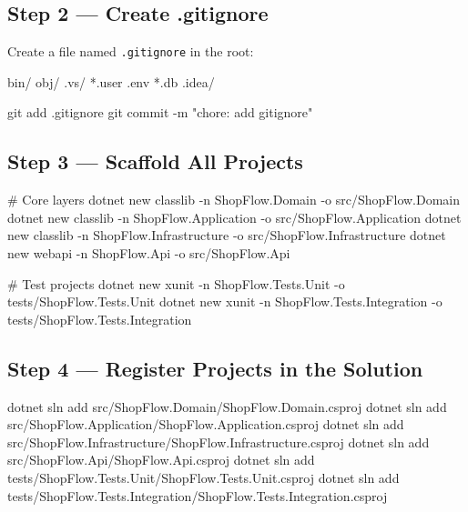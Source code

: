 \documentclass[11pt,a4paper]{article}
\begin{document}
\subsection{Step 2 --- Create .gitignore}

Create a file named \texttt{.gitignore} in the root:

\begin{codeframe}
\begin{codeblock}
bin/
obj/
.vs/
*.user
.env
*.db
.idea/
\end{codeblock}
\end{codeframe}

\begin{codeframe}
\begin{codeblock}
git add .gitignore
git commit -m "chore: add gitignore"
\end{codeblock}
\end{codeframe}

\subsection{Step 3 --- Scaffold All Projects}

\begin{codeframe}
\begin{codeblock}
# Core layers
dotnet new classlib -n ShopFlow.Domain         -o src/ShopFlow.Domain
dotnet new classlib -n ShopFlow.Application    -o src/ShopFlow.Application
dotnet new classlib -n ShopFlow.Infrastructure -o src/ShopFlow.Infrastructure
dotnet new webapi   -n ShopFlow.Api            -o src/ShopFlow.Api

# Test projects
dotnet new xunit -n ShopFlow.Tests.Unit        -o tests/ShopFlow.Tests.Unit
dotnet new xunit -n ShopFlow.Tests.Integration -o tests/ShopFlow.Tests.Integration
\end{codeblock}
\end{codeframe}

\subsection{Step 4 --- Register Projects in the Solution}

\begin{codeframe}
\begin{codeblock}
dotnet sln add src/ShopFlow.Domain/ShopFlow.Domain.csproj
dotnet sln add src/ShopFlow.Application/ShopFlow.Application.csproj
dotnet sln add src/ShopFlow.Infrastructure/ShopFlow.Infrastructure.csproj
dotnet sln add src/ShopFlow.Api/ShopFlow.Api.csproj
dotnet sln add tests/ShopFlow.Tests.Unit/ShopFlow.Tests.Unit.csproj
dotnet sln add tests/ShopFlow.Tests.Integration/ShopFlow.Tests.Integration.csproj
\end{codeblock}
\end{codeframe}
\end{document}
